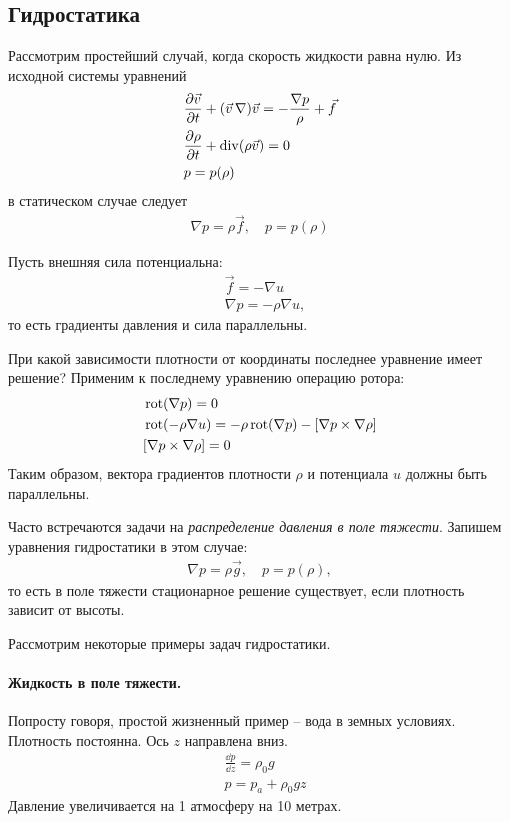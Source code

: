 \subsection{Гидростатика}
Рассмотрим простейший случай, когда скорость жидкости равна нулю. Из исходной системы уравнений 
\begin{align*}
& \frac { \partial \vec{v} } { \partial t } + ( \vec{v}\,\nabla ) \vec{v} = - \frac { \nabla p } { \rho } + \vec { f } \\
& \frac { \partial \rho } { \partial t } + \operatorname{div} ( \rho \vec{v} ) = 0 \\
& p = p ( \rho )
\end{align*}
в статическом случае следует
\begin{align*}
\nabla p = \rho \vec { f }, \quad 
p = p ( \rho )
\end{align*}

Пусть внешняя сила потенциальна:
\begin{align*}
& \vec { f } = - \nabla u \\
& \nabla p = - \rho \nabla u,
\end{align*}
то есть градиенты давления и сила параллельны.

При какой зависимости плотности от координаты последнее уравнение имеет решение? Применим к последнему уравнению операцию ротора:
\begin{align*}
&\operatorname{rot}( \nabla p ) = 0 \\
&\operatorname{rot}( - \rho \nabla u ) = - \rho\operatorname{rot}( \nabla p ) - [ \nabla p \times \nabla \rho ] \\ 
& [ \nabla p \times \nabla \rho ] = 0
\end{align*}
Таким образом,  вектора градиентов плотности $\rho$ и потенциала $u$ должны быть параллельны.

Часто встречаются задачи на \textit{распределение давления в поле тяжести}. Запишем уравнения гидростатики в этом случае:
\begin{align*}
\nabla p = \rho \vec { g }, \quad p = p ( \rho ),
\end{align*}
то есть в поле тяжести стационарное решение существует, если плотность зависит от высоты.

Рассмотрим некоторые примеры задач гидростатики.

\paragraph{Жидкость в поле тяжести.} Попросту говоря, простой жизненный пример -- вода в земных условиях.
Плотность постоянна. Ось $z$ направлена вниз.
	\begin{align*}
	& \frac { \dd p } { \dd z } = \rho_0 g \\
	& p = p_a + \rho_0 g z
	\end{align*}
	Давление увеличивается на 1 атмосферу на 10 метрах.


